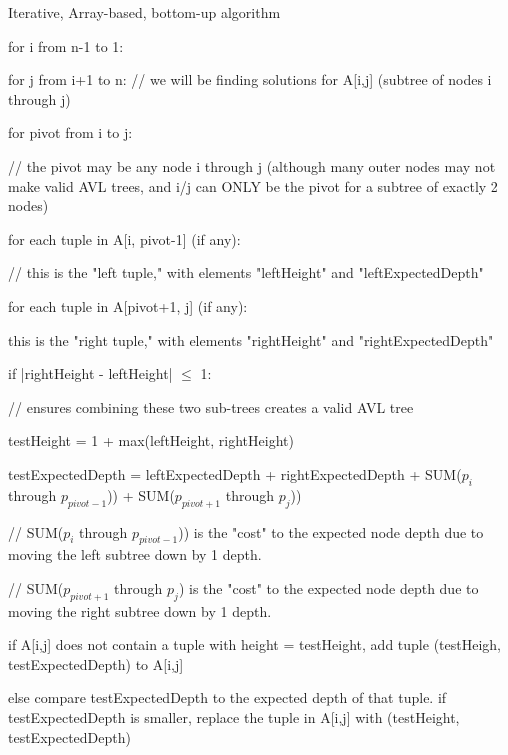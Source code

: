 \documentclass[a4paper]{article}
\begin{document}
Iterative, Array-based, bottom-up algorithm
\begin{myEnumerate}
\item for i from n-1 to 1:
\begin{myEnumerate}
\item for j from i+1 to n: // we will be finding solutions for A[i,j] (subtree of nodes i through j)
\begin{myEnumerate}
\item for pivot from i to j:
    \begin{myEnumerate}
    \item // the pivot may be any node i through j (although many outer nodes may not make valid AVL trees, and i/j can ONLY be the pivot for a subtree of exactly 2 nodes)
    \item for each tuple in A[i, pivot-1] (if any):
        \begin{myEnumerate}
        \item // this is the "left tuple," with elements "leftHeight" and "leftExpectedDepth"
        \item for each tuple in A[pivot+1, j] (if any):
            \begin{myEnumerate}
            \item this is the "right tuple," with elements "rightHeight" and "rightExpectedDepth"
            \item if |rightHeight - leftHeight| $\leq$ 1: 
                \begin{myEnumerate}
                \item // ensures combining these two sub-trees creates a valid AVL tree
                \item testHeight = 1 + max(leftHeight, rightHeight)
                \item testExpectedDepth = leftExpectedDepth + rightExpectedDepth + SUM($p_i$ through $p_{pivot-1}$)) + SUM($p_{pivot+1}$ through $p_{j}$))
                \item // SUM($p_i$ through $p_{pivot-1}$)) is the "cost" to the expected node depth due to moving the left subtree down by 1 depth.
                \item // SUM($p_{pivot+1}$ through $p_{j}$) is the "cost" to the expected node depth due to moving the right subtree down by 1 depth.
                \item if A[i,j] does not contain a tuple with height = testHeight, add tuple (testHeigh, testExpectedDepth) to A[i,j]
                \item else compare testExpectedDepth to the expected depth of that tuple. if testExpectedDepth is smaller, replace the tuple in A[i,j] with (testHeight, testExpectedDepth)
                \end{myEnumerate}
            \end{myEnumerate}
        \end{myEnumerate}
    \end{myEnumerate}
\end{myEnumerate}
\end{myEnumerate}
\end{myEnumerate}
                        
\end{document}
